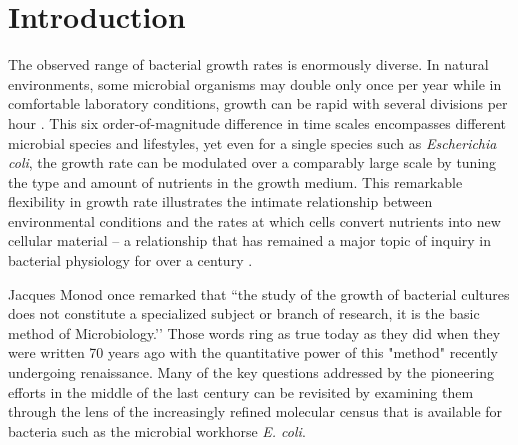 \section{Introduction}
The observed range of bacterial growth rates is enormously diverse. In
natural environments, some microbial organisms may double only once per
year \citep{mikucki2009} while in comfortable laboratory conditions, growth
can be rapid with several divisions per hour \citep{schaechter1958}. This six
order-of-magnitude difference in time scales encompasses different microbial
species and lifestyles, yet even for a single species such as \textit{Escherichia
coli}, the growth rate can be modulated over a comparably large scale by tuning the
type and amount of nutrients in the growth medium. This remarkable
flexibility in growth rate illustrates the intimate relationship between
environmental conditions and the rates at which cells convert nutrients into
new cellular material -- a relationship that has remained a major topic of
inquiry in bacterial physiology for over a century \citep{jun2018}.

Jacques Monod once remarked that ``the study of the growth of bacterial
cultures does not constitute a specialized subject or branch of research, it
is the basic method of Microbiology.’’ Those words ring as true today as they
did when they were written 70 years ago \citep{monod1949} with the
quantitative power of this "method" recently undergoing renaissance. Many of
the key questions addressed by the pioneering efforts in the middle of the
last century can be revisited by examining them through the lens of the
increasingly refined molecular census that is available for bacteria such as
the microbial workhorse \textit{E. coli}.

